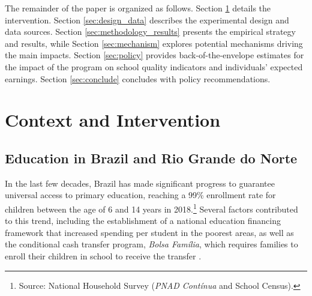 \documentclass[11pt,a4paper]{article}
\begin{document}
	
	The remainder of the paper is organized as follows. Section \ref{sec:context} details the intervention. Section \ref{sec:design_data} describes the experimental design and data sources. Section \ref{sec:methodology_results} presents the empirical strategy and results, while Section \ref{sec:mechanism} explores potential mechanisms driving the main impacts. Section \ref{sec:policy} provides back-of-the-envelope estimates for the impact of the program on school quality indicators and individuals' expected earnings. Section \ref{sec:conclude} concludes with policy recommendations.
	
	
	\section{Context and Intervention} \label{sec:context}
	
	\subsection{Education in Brazil and Rio Grande do Norte} \label{sec:brazil}
	
	In the last few decades, Brazil has made significant progress to guarantee universal access to primary education, reaching a 99\% enrollment rate for children between the age of 6 and 14 years in 2018.\footnote{Source: National Household Survey (\textit{PNAD Contínua} and School Census).} Several factors contributed to this trend, including the establishment of a national education financing framework that increased spending per student in the poorest areas, as well as the conditional cash transfer program, \textit{Bolsa Família}, which requires families to enroll their children in school to receive the transfer \citep{glewwe2012impact}. 
	
\end{document}

